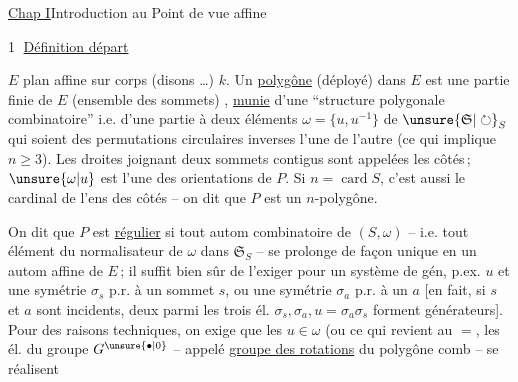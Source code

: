 \uline{Chap I}\qquad Introduction au Point de vue affine


\textcircled{1} \uline{Définition  départ}

$E$ plan affine sur corps (disons \ldots) $k$. Un \uline{polygône}
(déployé) dans $E$ est une partie finie  de $E$
(ensemble des sommets) , \uline{munie} d'une
``structure polygonale combinatoire'' i.e. d'une
partie à deux éléments $\omega=\{u,u^{-1}\}$ de $\unsure{\mathfrak{S}|\circlearrowright}_S$ qui soient
des permutations circulaires inverses l'une de l'autre (ce qui implique $n\geq3$). Les droites
joignant deux sommets contigus sont appelées les côtés\,; $\unsure{\omega|u}$ est  l'une des orientations de $P$. Si $n=\operatorname{card}S$,
c'est aussi le cardinal de l'ens des côtés -- on dit que $P$ est un $n$-polygône.

On dit que $P$ est \uline{régulier} si tout
autom combinatoire de  $(S,\omega)$ -- i.e. tout
élément du normalisateur  de $\omega$ dans $\mathfrak{S}_S$ --
se prolonge de façon unique en un autom
affine de $E$\,; il suffit bien sûr de l'exiger pour
 un système de gén, p.ex.  $u$ et une symétrie
$\sigma_s$ p.r. à un sommet $s$, ou une symétrie $\sigma_a$
p.r. à un   $a$ [en fait, si $s$ et $a$ sont
incidents, deux  parmi les trois él. $\sigma_s,\sigma_a,u=\sigma_a\sigma_s$
forment   générateurs]. Pour des raisons
techniques, on exige que les $u\in\omega$
(ou ce qui revient au $=$, les él. du
groupe  $G^{\unsure{\bullet|0}}$  -- appelé \uline{groupe des
rotations} du polygône comb -- se réalisent

